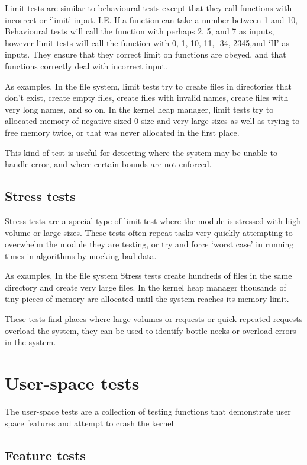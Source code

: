 \documentclass[a4paper]{report}
\begin{document}
Limit tests are similar to behavioural tests except that they call functions with incorrect or `limit' input. I.E. If a function can take a number between 1 and 10, Behavioural tests will call the function with perhaps 2, 5, and 7 as inputs, however limit tests will call the function with 0, 1, 10, 11, -34, 2345,and `H' as inputs. They ensure that they correct limit on functions are obeyed, and that functions correctly deal with incorrect input.

As examples, In the file system, limit tests try to create files in directories that don't exist, create empty files, create files with invalid names, create files with very long names, and so on. In the kernel heap manager, limit tests try to allocated memory of negative sized 0 size and very large sizes as well as trying to free memory twice, or that was never allocated in the first place.

This kind of test is useful for detecting where the system may be unable to handle error, and where certain bounds are not enforced.

\subsection{Stress tests}

Stress tests are a special type of limit test where the module is stressed with high volume or large sizes. These tests often repeat tasks very quickly attempting to overwhelm the module they are testing, or try and force `worst case' in running times in algorithms by mocking bad data.

As examples, In the file system Stress tests create hundreds of files in the same directory and create very large files. In the kernel heap manager thousands of tiny pieces of memory are allocated until the system reaches its memory limit.

These tests find places where large volumes or requests or quick repeated requests overload the system, they can be used to identify bottle necks or overload errors in the system.


\section{User-space tests}

The user-space tests are a collection of testing functions that demonstrate user space features and attempt to crash the kernel

\subsection{Feature tests}
\end{document}
